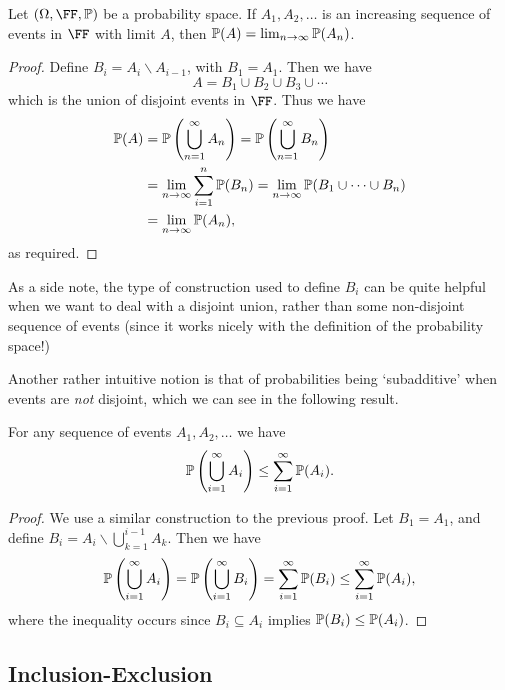 \documentclass[a4paper]{scrartcl}
\begin{document}
\begin{theorem}
	Let $(\Omega, \FF,\PP)$ be a probability space. If $A_1, A_2, \dots$ is an increasing sequence of events in $\FF$ with limit $A$, then $\mathbb{P}(A) = \lim_{n \to \infty} \mathbb{P}(A_n)$.
\end{theorem}
\begin{proof}
	Define $B_i = A_i \backslash A_{i - 1}$, with $B_1 = A_1$. Then we have
	$$
A = B_1 \cup B_2 \cup B_3 \cup \cdots
	$$
	which is the union of disjoint events in $\FF$. Thus we have
	\begin{align*}
		\mathbb{P}(A) &= \mathbb{P}\left(\bigcup_{n = 1}^{\infty} A_n\right) = \mathbb{P}\left(\bigcup_{n = 1}^{\infty} B_n\right) \\
		&= \lim_{n \to \infty} \sum_{i = 1}^{n} \mathbb{P}(B_n) = \lim_{n \to \infty} \mathbb{P}(B_1 \cup \cdots \cup B_n) \\ &= \lim_{n \to \infty} \mathbb{P}(A_n),
	\end{align*}
	as required.
\end{proof}

As a side note, the type of construction used to define $B_i$ can be quite helpful when we want to deal with a disjoint union, rather than some non-disjoint sequence of events (since it works nicely with the definition of the probability space!)

Another rather intuitive notion is that of probabilities being `subadditive' when events are \emph{not} disjoint, which we can see in the following result.

\begin{theorem}
	For any sequence of events $A_1, A_2, \dots$ we have
	$$
	\mathbb{P}\left(\bigcup_{i = 1}^{\infty} A_i\right) \leq \sum_{i = 1}^{\infty} \mathbb{P}(A_i).
	$$
\end{theorem}
\begin{proof}
	We use a similar construction to the previous proof. Let $B_1 = A_1$, and define $B_i = A_i \backslash \bigcup_{k = 1}^{i - 1} A_k$. Then we have
	$$
	\mathbb{P}\left(\bigcup_{i = 1}^{\infty} A_i\right) = \mathbb{P}\left(\bigcup_{i = 1}^{\infty} B_i\right) = \sum_{i = 1}^{\infty} \mathbb{P}(B_i) \leq \sum_{i = 1}^{\infty} \mathbb{P}(A_i),
	$$
	where the inequality occurs since $B_i \subseteq A_i$ implies $\mathbb{P}(B_i) \leq \mathbb{P}(A_i)$.
\end{proof}

\subsection{Inclusion-Exclusion}
\end{document}
